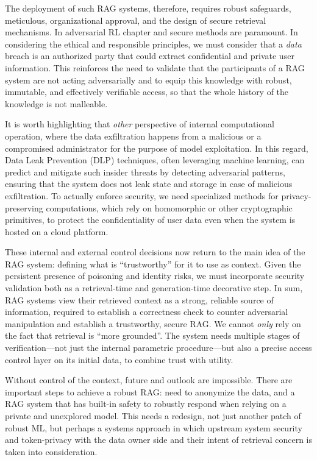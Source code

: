 \documentclass[11pt]{article}
\begin{document}
The deployment of such RAG systems, therefore, requires robust safeguards, meticulous, organizational approval, and the design of secure retrieval mechanisms. In adversarial RL chapter and secure methods are paramount. In considering the ethical and responsible principles, we must consider that a \emph{data} breach is an authorized party that could extract confidential and private user information. This reinforces the need to validate that the participants of a RAG system are not acting adversarially and to equip this knowledge with robust, immutable, and effectively verifiable access, so that the whole history of the knowledge is not malleable.

It is worth highlighting that \emph{other} perspective of internal computational operation, where the data exfiltration happens from a malicious or a compromised administrator for the purpose of model exploitation. In this regard, Data Leak Prevention (DLP) techniques, often leveraging machine learning, can predict and mitigate such insider threats by detecting adversarial patterns, ensuring that the system does not leak state and storage in case of malicious exfiltration. To actually enforce security, we need specialized methods for privacy-preserving computations, which rely on homomorphic or other cryptographic primitives, to protect the confidentiality of user data even when the system is hosted on a cloud platform.

These internal and external control decisions now return to the main idea of the RAG system: defining what is ``trustworthy'' for it to use as context. Given the persistent presence of poisoning and identity risks, we must incorporate security validation both as a retrieval-time and generation-time decorative step. In sum, RAG systems view their retrieved context as a strong, reliable source of information, required to establish a correctness check to counter adversarial manipulation and establish a trustworthy, secure RAG. We cannot \emph{only} rely on the fact that retrieval is ``more grounded''. The system needs multiple stages of verification---not just the internal parametric procedure---but also a precise access control layer on its initial data, to combine trust with utility.

Without control of the context, future and outlook are impossible. There are important steps to achieve a robust RAG: need to anonymize the data, and a RAG system that has built-in safety to robustly respond when relying on a private and unexplored model. This needs a redesign, not just another patch of robust ML, but perhaps a systems approach in which upstream system security and token-privacy with the data owner side and their intent of retrieval concern is taken into consideration.
\end{document}
